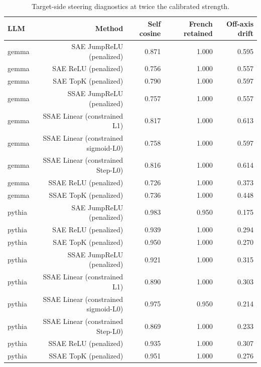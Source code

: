 \begin{table}[t]
\centering
\caption{Target-side steering diagnostics at twice the calibrated strength.}
\label{tab:target-overshoot-two-alpha}
\begin{tabular}{lrrrr}
\toprule
LLM & Method & Self cosine & French retained & Off-axis drift \\
\midrule
gemma & SAE JumpReLU (penalized) & 0.871 & 1.000 & 0.595 \\
gemma & SAE ReLU (penalized) & 0.756 & 1.000 & 0.557 \\
gemma & SAE TopK (penalized) & 0.790 & 1.000 & 0.597 \\
gemma & SSAE JumpReLU (penalized) & 0.757 & 1.000 & 0.557 \\
gemma & SSAE Linear (constrained L1) & 0.817 & 1.000 & 0.613 \\
gemma & SSAE Linear (constrained sigmoid-L0) & 0.758 & 1.000 & 0.597 \\
gemma & SSAE Linear (constrained Step-L0) & 0.816 & 1.000 & 0.614 \\
gemma & SSAE ReLU (penalized) & 0.726 & 1.000 & 0.373 \\
gemma & SSAE TopK (penalized) & 0.736 & 1.000 & 0.448 \\
pythia & SAE JumpReLU (penalized) & 0.983 & 0.950 & 0.175 \\
pythia & SAE ReLU (penalized) & 0.939 & 1.000 & 0.294 \\
pythia & SAE TopK (penalized) & 0.950 & 1.000 & 0.270 \\
pythia & SSAE JumpReLU (penalized) & 0.921 & 1.000 & 0.315 \\
pythia & SSAE Linear (constrained L1) & 0.890 & 1.000 & 0.303 \\
pythia & SSAE Linear (constrained sigmoid-L0) & 0.975 & 0.950 & 0.214 \\
pythia & SSAE Linear (constrained Step-L0) & 0.869 & 1.000 & 0.233 \\
pythia & SSAE ReLU (penalized) & 0.935 & 1.000 & 0.307 \\
pythia & SSAE TopK (penalized) & 0.951 & 1.000 & 0.276 \\
\bottomrule
\end{tabular}
\end{table}
